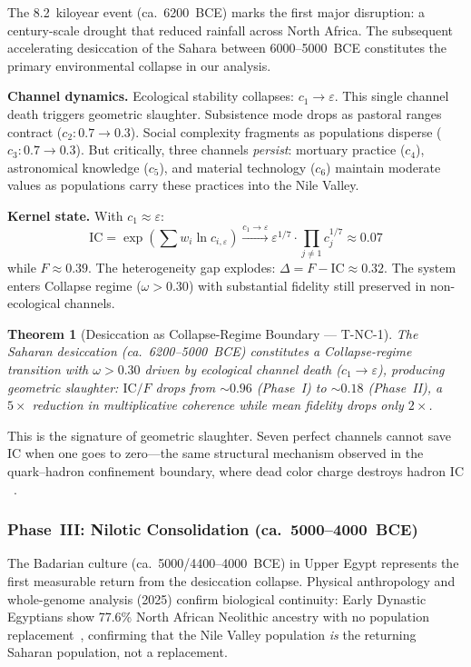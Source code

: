 \documentclass[
  aps,
  prd,
  twocolumn,
  superscriptaddress,
  nofootinbib,
  floatfix
]{revtex4-2}
\newtheorem{theorem}{Theorem}
\newcommand{\eps}{\varepsilon}
\newcommand{\beq}{\begin{equation}}
\newcommand{\eeq}{\end{equation}}
\newcommand{\IC}{\mathrm{IC}}
\begin{document}
The 8.2~kiloyear event (ca.\ 6200~BCE) marks the
first major disruption: a century-scale drought that
reduced rainfall across North Africa.  The subsequent
accelerating desiccation of the Sahara between
6000--5000~BCE constitutes the primary environmental
collapse in our analysis.

\textbf{Channel dynamics.}  Ecological stability
collapses: $c_1 \to \eps$.  This single channel
death triggers geometric slaughter.  Subsistence mode
drops as pastoral ranges contract ($c_2: 0.7 \to
0.3$).  Social complexity fragments as
populations disperse ($c_3: 0.7 \to 0.3$).  But
critically, three channels \emph{persist}: mortuary
practice ($c_4$), astronomical knowledge ($c_5$),
and material technology ($c_6$) maintain moderate
values as populations carry these practices into
the Nile Valley.

\textbf{Kernel state.}  With $c_1 \approx \eps$:
\beq
\IC = \exp\!\left(\sum w_i \ln c_{i,\eps}\right)
\xrightarrow{c_1 \to \eps} \eps^{1/7} \cdot
\prod_{j \neq 1} c_j^{1/7} \approx 0.07
\eeq
while $F \approx 0.39$.  The heterogeneity gap
explodes: $\Delta = F - \IC \approx 0.32$.  The
system enters Collapse regime ($\omega > 0.30$) with
substantial fidelity still preserved in non-ecological
channels.

\begin{theorem}[Desiccation as Collapse-Regime
Boundary --- T-NC-1]\label{thm:collapse}
The Saharan desiccation (ca.\ 6200--5000~BCE)
constitutes a Collapse-regime transition with
$\omega > 0.30$ driven by ecological channel death
($c_1 \to \eps$), producing geometric slaughter:
$\IC/F$ drops from $\sim\!0.96$ (Phase~I) to
$\sim\!0.18$ (Phase~II), a $5\times$ reduction in
multiplicative coherence while mean fidelity drops
only $2\times$.
\end{theorem}

This is the signature of geometric slaughter.
Seven perfect channels cannot save $\IC$ when one
goes to zero---the same structural mechanism observed
in the quark--hadron confinement boundary, where dead
color charge destroys hadron
$\IC$~\cite{paulus2025umcp}.


\subsubsection{Phase~III: Nilotic Consolidation
(ca.\ 5000--4000~BCE)}\label{sec:return}

The Badarian culture (ca.\ 5000/4400--4000~BCE) in
Upper Egypt represents the first measurable return
from the desiccation collapse.  Physical anthropology
and whole-genome analysis (2025) confirm biological
continuity: Early Dynastic Egyptians show 77.6\%
North African Neolithic ancestry with no population
replacement~\cite{marshall2025genome}, confirming that
the Nile Valley population \emph{is} the returning
Saharan population, not a replacement.
\end{document}
